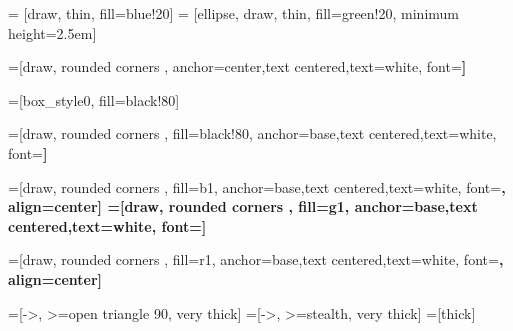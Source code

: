 \usepackage[utf8]{inputenc}
\usepackage{lmodern}
\usepackage[T1]{fontenc}
\usepackage{mathenv}
\usepackage{array}
\usepackage{amsmath}
\usepackage{mathtools}%
\usepackage{wasysym}
\usepackage{amsfonts}
\usepackage{amssymb, amsbsy}
\usepackage[utf8]{inputenc}
\usepackage{graphicx}
\usepackage{multimedia}
\usepackage{multicol}
\usepackage{multirow}
\usepackage{fourier}
\usepackage{makecell}



\usepackage{eurosym}

\usepackage{color}

\usepackage{cancel}
\usepackage{enumitem}

\usepackage{tikz}
\usetikzlibrary{shapes,arrows,shadows,calc, angles}
\usetikzlibrary{arrows,shapes}
\usetikzlibrary{positioning}

\usepackage{verbatim}

 = [draw, thin, fill=blue!20]
 = [ellipse, draw, thin, fill=green!20, minimum height=2.5em]


=[draw, rounded corners ,
anchor=center,text centered,text=white, font=\bfseries] %

=[box_style0, fill=black!80] %

=[draw, rounded corners , fill=black!80,
anchor=base,text centered,text=white, font=\bfseries] %

=[draw, rounded corners , fill=b1,
anchor=base,text centered,text=white, font=\bfseries, align=center] %
=[draw, rounded corners , fill=g1,
anchor=base,text centered,text=white, font=\bfseries] %

=[draw, rounded corners , fill=r1,
anchor=base,text centered,text=white, font=\bfseries, align=center] %

=[->, >=open triangle 90, very thick]
=[->, >=stealth, very thick]
=[thick]



